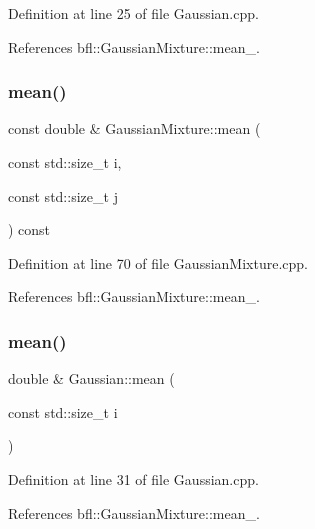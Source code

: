 Definition at line 25 of file Gaussian.\+cpp.



References bfl\+::\+Gaussian\+Mixture\+::mean\+\_\+.

\mbox{\label{classbfl_1_1GaussianMixture_ac3baa237bc22f156f57d4c02deb4f518}} 
\subsubsection{\texorpdfstring{mean()}{mean()}\hspace{0.1cm}{\footnotesize\ttfamily [4/6]}}
{\footnotesize\ttfamily const double \& Gaussian\+Mixture\+::mean (\begin{DoxyParamCaption}\item[{const std\+::size\+\_\+t}]{i,  }\item[{const std\+::size\+\_\+t}]{j }\end{DoxyParamCaption}) const\hspace{0.3cm}{\ttfamily [inherited]}}



Definition at line 70 of file Gaussian\+Mixture.\+cpp.



References bfl\+::\+Gaussian\+Mixture\+::mean\+\_\+.

\mbox{\label{classbfl_1_1Gaussian_aa19856ef77d8d6599ff22884174eda9a}} 
\subsubsection{\texorpdfstring{mean()}{mean()}\hspace{0.1cm}{\footnotesize\ttfamily [5/6]}}
{\footnotesize\ttfamily double \& Gaussian\+::mean (\begin{DoxyParamCaption}\item[{const std\+::size\+\_\+t}]{i }\end{DoxyParamCaption})}



Definition at line 31 of file Gaussian.\+cpp.



References bfl\+::\+Gaussian\+Mixture\+::mean\+\_\+.

